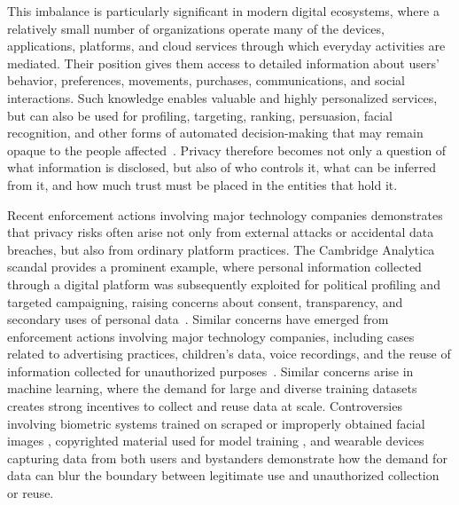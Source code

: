 This imbalance is particularly significant in modern digital ecosystems, where a relatively small number of organizations operate many of the devices, applications, platforms, and cloud services through which everyday activities are mediated. Their position gives them access to detailed information about users' behavior, preferences, movements, purchases, communications, and social interactions. Such knowledge enables valuable and highly personalized services, but can also be used for profiling, targeting, ranking, persuasion, facial recognition, and other forms of automated decision-making that may remain opaque to the people affected~\cite{pasquale_black_box_society_2015,veliz_privacy_is_power_2021}. Privacy therefore becomes not only a question of what information is disclosed, but also of who controls it, what can be inferred from it, and how much trust must be placed in the entities that hold it.


 Recent enforcement actions involving major technology companies demonstrates that privacy risks often arise not only from external attacks or accidental data breaches, but also from ordinary platform practices.
The Cambridge Analytica scandal provides a prominent example, where personal information collected through a digital platform was subsequently exploited for political profiling and targeted campaigning, raising concerns about consent, transparency, and secondary uses of personal data~\cite{ico_democracy_disrupted_2018,ico_data_analytics_political_campaigns_2018}. Similar concerns have emerged from enforcement actions involving major technology companies, including cases related to advertising practices, children's data, voice recordings, and the reuse of information collected for unauthorized purposes~\cite{cnil_google_gdpr_2019,ftc_youtube_coppa_2019,ftc_twitter_security_data_ads_2022,ftc_amazon_alexa_coppa_2023,texas_ag_google_privacy_2025}. 
Similar concerns arise in machine learning, where the demand for large and diverse training datasets creates strong incentives to collect and reuse data at scale. Controversies involving biometric systems trained on scraped or improperly obtained facial images , copyrighted material used for model training , and wearable devices capturing data from both users and bystanders  demonstrate how the demand for data can blur the boundary between legitimate use and unauthorized collection or reuse.


